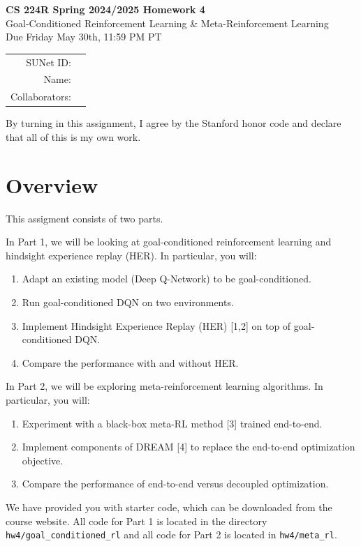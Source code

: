\documentclass[12pt]{article}
\begin{document}
\begin{center}
{\Large \textbf{CS 224R Spring 2024/2025 Homework 4} \\ Goal-Conditioned Reinforcement Learning \& Meta-Reinforcement Learning
\\ 
\vspace{0.2cm}
Due Friday May 30th, 11:59 PM PT}

\begin{tabular}{rl}
SUNet ID: &  \\
Name: & \\
Collaborators: & 
\end{tabular}
\end{center}

By turning in this assignment, I agree by the Stanford honor code and declare that all of this is my own work.

\section*{Overview}
This assigment consists of two parts. 

In Part 1, we will be looking at goal-conditioned reinforcement learning and hindsight experience replay (HER). In particular, you will:

\begin{enumerate}
    \item Adapt an existing model (Deep Q-Network) to be goal-conditioned.
    \item Run goal-conditioned DQN on two environments.
    \item Implement Hindsight Experience Replay (HER) [1,2] on top of goal-conditioned DQN.
    \item Compare the performance with and without HER.
\end{enumerate}


In Part 2, we will be exploring meta-reinforcement learning algorithms. In particular, you will:

\begin{enumerate}
    \item Experiment with a black-box meta-RL method [3] trained end-to-end.
    \item Implement components of DREAM [4] to replace the end-to-end optimization objective.
    \item Compare the performance of end-to-end versus decoupled optimization.
\end{enumerate}


\noindent We have provided you with starter code, which can be downloaded from the course website. All code for Part 1 is located in the directory \texttt{hw4/goal\_conditioned\_rl} and all code for Part 2 is located in \texttt{hw4/meta\_rl}.
\end{document}
